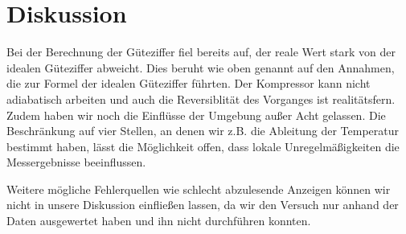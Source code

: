 \section{Diskussion}
\label{sec:Diskussion}

Bei der Berechnung der Güteziffer fiel bereits auf, der reale Wert stark von der idealen Güteziffer abweicht.
Dies beruht wie oben genannt auf den Annahmen, die zur Formel der idealen Güteziffer führten.
Der Kompressor kann nicht adiabatisch arbeiten und auch die Reversiblität des Vorganges ist realitätsfern.
Zudem haben wir noch die Einflüsse der Umgebung außer Acht gelassen.
Die Beschränkung auf vier Stellen, an denen wir z.B. die Ableitung der Temperatur bestimmt haben, lässt die Möglichkeit offen, dass lokale Unregelmäßigkeiten die Messergebnisse beeinflussen.

Weitere mögliche Fehlerquellen wie schlecht abzulesende Anzeigen können wir nicht in unsere Diskussion einfließen lassen, da wir den Versuch nur anhand der Daten ausgewertet haben und ihn nicht durchführen konnten.
